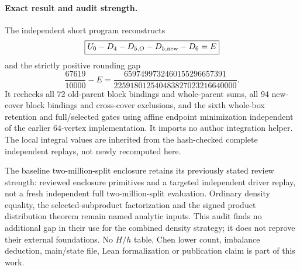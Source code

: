 \paragraph{Exact result and audit strength.}
The independent short program reconstructs
\[
 \boxed{U_0-D_4-D_{5,O}-D_{5,\rm new}-D_6=E}
\]
and the strictly positive rounding gap
\[
 \frac{67619}{10000}-E
 =\frac{6597499732460155296657391}
         {225918012540483827023216640000}.
\]
It rechecks all 72 old-parent block bindings and whole-parent
sums, all 94 new-cover block bindings and cross-cover exclusions,
and the sixth whole-box retention and full/selected gates using
affine endpoint minimization independent of the earlier
64-vertex implementation. It imports no author integration helper.
The local integral values are inherited from the hash-checked
complete independent replays, not newly recomputed here.

The baseline two-million-split enclosure retains its previously
stated review strength: reviewed enclosure primitives and a
targeted independent driver replay, not a fresh independent
full two-million-split evaluation. Ordinary density equality,
the selected-subproduct factorization and the signed product
distribution theorem remain named analytic inputs. This audit
finds no additional gap in their use for the combined density
strategy; it does not reprove their external foundations.
No $H/h$ table, Chen lower count, imbalance deduction, main/state
file, Lean formalization or publication claim is part of this work.
